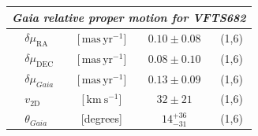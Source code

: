 \documentclass[a4paper,fleqn,usenatbib]{mnras}
\newcommand{\SdM}[1]{{{\color{brown}{#1}}}}
\newcommand{\kms}{{\,\mathrm{km\ s^{-1}}}}
\newcommand{\masyr}{\,\mathrm{mas}\,\mathrm{yr}^{-1}}
\begin{document}
\begin{table}
\begin{center}
\begin{tabular}{llc|c|c}
                


      \multicolumn{5}{l}{\emph{Gaia relative proper motion for VFTS682 }} \\
      \hline
      &$\delta\mu_\mathrm{RA}$  &[$\masyr$] & $0.10\pm0.08$ & (1,6) \\
      &$\delta\mu_\mathrm{DEC}$  &[$\masyr$] & $0.08\pm0.10$ &  (1,6) \\
      &$\delta\mu_{Gaia}$  &[$\masyr$] & $0.13\pm0.09$ &  (1,6) \\
      &$v_\mathrm{2D}$  &[$\kms$] & $32\pm21$ & (1,6)\\  
      &$\theta_{Gaia}$  &[degrees] &  $14_{-31}^{+36}$  & (1,6)\\  


\end{tabular}
\end{center}
\end{table}
\end{document}
